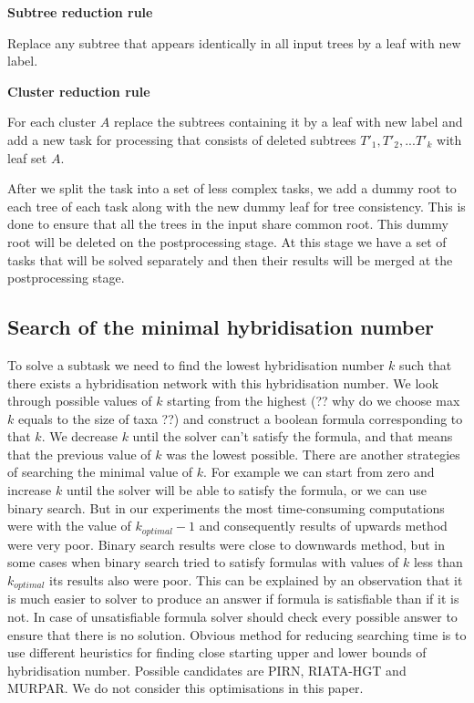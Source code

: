\documentclass[runningheads, envcountsame, a4paper]{llncs}
\begin{document}
\textbf{Subtree reduction rule}

Replace any subtree that appears identically in all input trees by a leaf with new label.

\textbf{Cluster reduction rule}

For each cluster $A$ replace the subtrees containing it by a leaf with new label and add a new task for processing that consists of deleted subtrees $T'_1, T'_2, ... T'_k$ with leaf set $A$.

After we split the task into a set of less complex tasks, we add a dummy root to each tree of each task along with the new dummy leaf for tree consistency. This is done to ensure that all the trees in the input share common root. This dummy root will be deleted on the postprocessing stage. At this stage we have a set of tasks that will be solved separately and then their results will be merged at the postprocessing stage.

\subsection{Search of the minimal hybridisation number}

To solve a subtask we need to find the lowest hybridisation number $k$ such that there exists a hybridisation network with this hybridisation number. We look through possible values of $k$ starting from the highest (?? why do we choose max $k$ equals to the size of taxa ??) and construct a boolean formula corresponding to that $k$. We decrease $k$ until the solver can't satisfy the formula, and that means that the previous value of $k$ was the lowest possible. There are another strategies of searching the minimal value of $k$. For example we can start from zero and increase $k$ until the solver will be able to satisfy the formula, or we can use binary search. But in our experiments the most time-consuming computations were with the value of $k_{optimal} - 1$ and consequently results of upwards method were very poor. Binary search results were close to downwards method, but in some cases when binary search tried to satisfy formulas with values of $k$ less than $k_{optimal}$ its results also were poor. This can be explained by an observation that it is much easier to solver to produce an answer if formula is satisfiable than if it is not. In case of unsatisfiable formula solver should check every possible answer to ensure that there is no solution. Obvious method for reducing searching time is to use different heuristics for finding close starting upper and lower bounds of hybridisation number. Possible candidates are PIRN, RIATA-HGT and MURPAR. We do not consider this optimisations in this paper.
\end{document}
